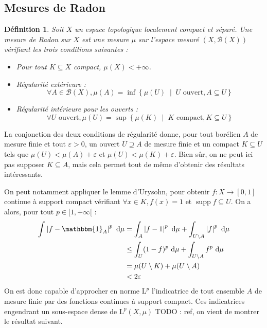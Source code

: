 \documentclass[a4paper,12pt]{article}
\newtheorem{definition}[theorem]{Définition}
\newcommand{\Bor}{\mathcal{B}}
\newcommand{\abs}[1]{\left\vert#1\right\vert}
\newcommand{\set}[1]{\left\{ #1 \right\}}
\newcommand{\indic}{\mathbbm{1}}
\newcommand{\integral}[4]{\int_{#1}^{#2} #3~\mathrm{d}#4}
\newcommand{\tq}{\;\middle|\;}
\newcommand{\TODO}[1]{{\color{red}TODO :} #1}
\DeclareMathOperator{\Supp}{supp}
\begin{document}
\subsection*{Mesures de Radon}

\begin{definition}
    Soit $X$ un espace topologique localement compact et séparé. Une \emph{mesure de Radon} sur $X$
    est une mesure $\mu$ sur l'espace mesuré $(X, \Bor(X))$ vérifiant les trois conditions suivantes :
    \begin{itemize}
        \item Pour tout $K\subseteq X$ compact, $\mu(X)<+\infty$.
        \item Régularité extérieure : 
        \begin{equation*}
            \forall A\in\Bor(X), \mu(A) = \inf \set{\mu(U) \tq U\text{ ouvert}, A\subseteq U}
        \end{equation*}
        \item Régularité intérieure pour les ouverts : 
        \begin{equation*}
            \forall U\text{ ouvert}, \mu(U) = \sup \set{\mu(K) \tq K\text{ compact}, K\subseteq U}
        \end{equation*}
    \end{itemize}
\end{definition}

La conjonction des deux conditions de régularité donne, pour tout borélien $A$ de mesure finie et tout $\varepsilon>0$,
un ouvert $U\supseteq A$ de mesure finie et un compact $K\subseteq U$ tels que $\mu(U)<\mu(A)+\varepsilon$ et 
$\mu(U)<\mu(K)+\varepsilon$. Bien sûr, on ne peut ici pas supposer $K\subseteq A$, mais cela permet 
tout de même d'obtenir des résultats intéressants.

On peut notamment appliquer le lemme d'Urysohn, pour obtenir $f:X\to[0,1]$ continue à support compact
vérifiant $\forall x\in K, f(x) = 1$ et $\Supp f\subseteq U$. On a alors, pour tout $p\in[1, +\infty[$ : 
\begin{align*}
    \integral{}{}{\abs{f-\indic_A}^p}{\mu} 
        &= \integral{A}{}{\abs{f-1}^p}{\mu} + \integral{U\setminus A}{}{\abs{f}^p}{\mu} \\
        &\le \integral{U}{}{(1-f)^p}{\mu} + \integral{U\setminus A}{}{f^p}{\mu} \\
        &= \mu(U\setminus K) + \mu(U\setminus A) \\
        &< 2\varepsilon
\end{align*}
On est donc capable d'approcher en norme $\mathrm{L}^p$ l'indicatrice de tout ensemble $A$ de mesure finie par des fonctions continues 
à support compact. Ces indicatrices engendrant un sous-espace dense de $\mathrm{L}^p(X, \mu)$ \TODO{ref}, on vient de montrer le résultat suivant.
\end{document}
